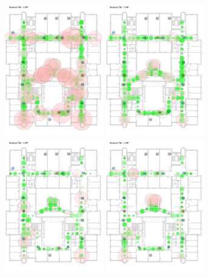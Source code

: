 \begin{figure}[h!]
	\begin{centering}
		\includegraphics[width=0.38\textwidth]{img/combined_error_classic}
		\hspace{0.3cm}
		\includegraphics[width=0.38\textwidth]{img/combined_error_multiple_f}
		\includegraphics[width=0.38\textwidth]{img/combined_error_f_combination}
		\hspace{0.3cm}
		\includegraphics[width=0.38\textwidth]{img/phone_error}

\end{centering}
\end{figure}

